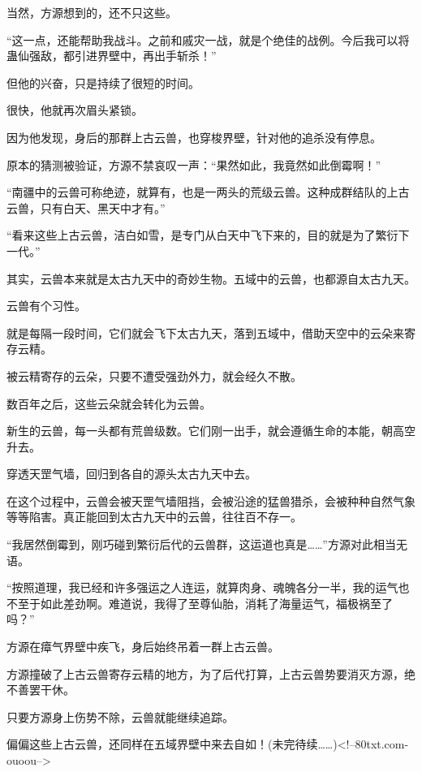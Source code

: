 \begin{this_body}
当然，方源想到的，还不只这些。

“这一点，还能帮助我战斗。之前和戚灾一战，就是个绝佳的战例。今后我可以将蛊仙强敌，都引进界壁中，再出手斩杀！”

但他的兴奋，只是持续了很短的时间。

很快，他就再次眉头紧锁。

因为他发现，身后的那群上古云兽，也穿梭界壁，针对他的追杀没有停息。

原本的猜测被验证，方源不禁哀叹一声：“果然如此，我竟然如此倒霉啊！”

“南疆中的云兽可称绝迹，就算有，也是一两头的荒级云兽。这种成群结队的上古云兽，只有白天、黑天中才有。”

“看来这些上古云兽，洁白如雪，是专门从白天中飞下来的，目的就是为了繁衍下一代。”

其实，云兽本来就是太古九天中的奇妙生物。五域中的云兽，也都源自太古九天。

云兽有个习性。

就是每隔一段时间，它们就会飞下太古九天，落到五域中，借助天空中的云朵来寄存云精。

被云精寄存的云朵，只要不遭受强劲外力，就会经久不散。

数百年之后，这些云朵就会转化为云兽。

新生的云兽，每一头都有荒兽级数。它们刚一出手，就会遵循生命的本能，朝高空升去。

穿透天罡气墙，回归到各自的源头太古九天中去。

在这个过程中，云兽会被天罡气墙阻挡，会被沿途的猛兽猎杀，会被种种自然气象等等陷害。真正能回到太古九天中的云兽，往往百不存一。

“我居然倒霉到，刚巧碰到繁衍后代的云兽群，这运道也真是……”方源对此相当无语。

“按照道理，我已经和许多强运之人连运，就算肉身、魂魄各分一半，我的运气也不至于如此差劲啊。难道说，我得了至尊仙胎，消耗了海量运气，福极祸至了吗？”

方源在瘴气界壁中疾飞，身后始终吊着一群上古云兽。

方源撞破了上古云兽寄存云精的地方，为了后代打算，上古云兽势要消灭方源，绝不善罢干休。

只要方源身上伤势不除，云兽就能继续追踪。

偏偏这些上古云兽，还同样在五域界壁中来去自如！(未完待续……)<!--80txt.com-ouoou-->

\end{this_body}

